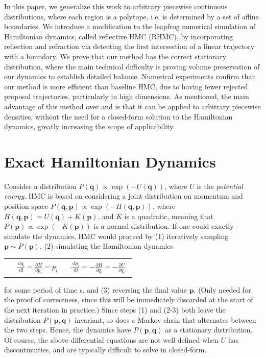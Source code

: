 \documentclass{article} %
\newcommand{\bvec}[1]{\textbf{#1}}
\newcommand{\dd}{\;\mathrm{d}} %
\begin{document}
In this paper, we generalize this work to arbitrary piecewise continuous distributions, where each region is a polytope, i.e. is determined by a set of affine boundaries.  We introduce a modification to the leapfrog numerical simulation of Hamiltonian dynamics, called reflective HMC (RHMC), by incorporating reflection and refraction via detecting the first intersection of a linear trajectory with a boundary. We prove that our method has the correct stationary distribution, where the main technical difficulty is proving volume preservation of our dynamics to establish detailed balance.  Numerical experiments confirm that our method is more efficient than baseline HMC, due to having fewer rejected proposal trajectories, particularly in high dimensions.  As mentioned, the main advantage of this method over \cite{pakman2014exact} and \cite{pakman2013auxiliary} is that it can be applied to arbitrary piecewise densities, without the need for a closed-form solution to the Hamiltonian dynamics, greatly increasing the scope of applicability.


\section{Exact Hamiltonian Dynamics }

Consider a distribution $P(\bvec{q})\propto \exp(-U(\bvec{q}))$, where $U$ is the \emph{potential energy}.  HMC \cite{neal2011mcmc} is based on considering a joint distribution on momentum and position space $P(\bvec{q}, \bvec{p})\propto\exp(-H(\bvec{q}, \bvec{p}))$, where $H(\bvec{q}, \bvec{p})=U(\bvec{q})+K(\bvec{p})$, and $K$ is a quadratic, meaning that $P(\bvec{p}) \propto \exp(-K(\bvec{p}))$ is a normal distribution.  If one could exactly simulate the dynamics, HMC would proceed by (1) iteratively sampling $\bvec{p} \sim P(\bvec{p})$, 
(2) simulating the Hamiltonian dynamics
%
\begin{tabular}{p{5.5cm}p{7.8cm}}
{
\begin{align}\label{e:motion1}
&
\frac{\dd q_i}{\dd t} = \frac{\partial H}{\partial p_{i}} = p_i
\end{align} }
&{
\begin{align}\label{e:motion2}
\frac{\dd p_i}{\dd t} = 
-\frac{\partial H}{\partial q_{i}} = 
-\frac{\partial U}{\partial q_{i}}
\end{align} 
}
\end{tabular}
%
for some period of time $\epsilon$, and (3) reversing the final value $\bvec{p}$.  (Only needed for the proof of correctness, since this will be immediately discarded at the start of the next iteration in practice.)  Since steps (1) and (2-3) both leave the distribution $P(\bvec{p}, \bvec{q})$ invariant, so does a Markov chain that alternates between the two steps.  Hence, the dynamics have $P(\bvec{p}, \bvec{q})$ as a stationary distribution.  Of course, the above differential equations are not well-defined when $U$ has discontinuities, and are typically difficult to solve in closed-form.
\end{document}
